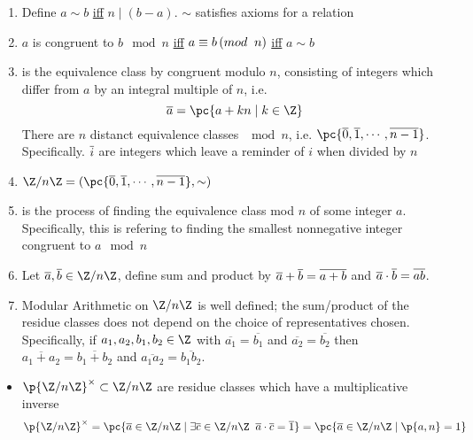 \documentclass[11pt]{article}
\begin{document}
\begin{definition*}
    \begin{enumerate}
        \item {} Define $a\sim b$ \underline{iff} $n \mid (b-a)$. $\sim$ satisfies axioms for a relation
        \item {} $a$ is congruent to $b \mod n$ \underline{iff} $a \equiv b \left(mod \;\; n \right)$ \underline{iff} $a\sim b$
        \item {} is the equivalence class by congruent modulo $n$, consisting of integers which differ from $a$ by an integral multiple of $n$, i.e. 
        \[
            \overline{a} = \pc{a+kn \mid k\in \Z}        
        \]
        There are $n$ distanct equivalence classes $\mod n$, i.e. $\pc{\overline{0}, \overline{1}, \cdots, \overline{n-1}}$. Specifically. $\overline{i}$ are integers which leave a reminder of $i$ when divided by $n$
        \item {} $\integermodn = (\pc{\overline{0}, \overline{1}, \cdots, \overline{n-1}}, \sim)$
        \item {} is the process of finding the equivalence class mod $n$ of some integer $a$. Specifically, this is refering to finding the smallest nonnegative integer congruent to $a\mod n$
        \item {} Let $\oa,\ob \in \integermodn$, define sum and product by $\overline{a} + \overline{b} = \overline{a+b}$ and $\overline{a} \cdot \overline{b} = \overline{ab}$.
        \item {} Modular Arithmetic on $\integermodn$ is well defined; the sum/product of the residue classes does not depend on the choice of representatives chosen. Specifically, if $a_1,a_2,b_1,b_2\in \Z$ with $\overline{a_1} = \overline{b_1}$ and $\overline{a_2} = \overline{b_2}$ then $\overline{a_1 + a_2} = \overline{b_1 + b_2}$ and $\overline{a_1 a_2} = \overline{b_1 b_2}$.
    \end{enumerate}
    \begin{itemize}
        \item $\p{\integermodn}^{\times} \subset \integermodn$ are residue classes which have a multiplicative inverse
        \[
            \p{\integermodn}^{\times} = \pc{
                \oa \in \integermodn \mid
                \exists \oc \in \integermodn \;\; \oa \cdot \oc = \overline{1}
            } = \pc{
                \oa \in \integermodn \mid \p{a,n} = 1
            }
        \]
    \end{itemize}
\end{definition*}
 
\end{document}
